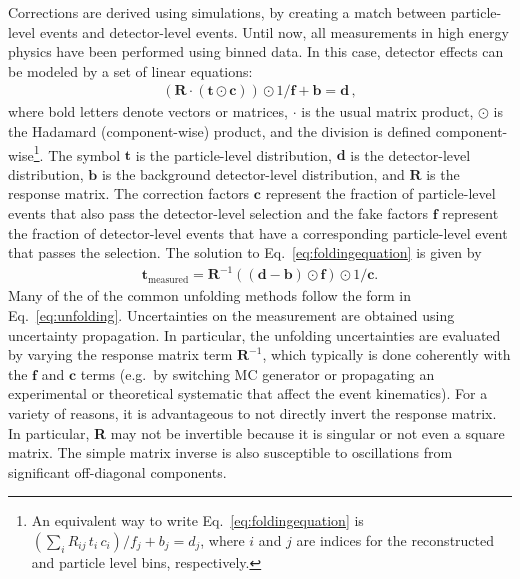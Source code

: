 Corrections are derived using simulations, by creating a match between particle-level events and detector-level events.  Until now, all measurements in high energy physics have been performed using binned data.   In this case, detector effects can be modeled by a set of linear equations:
\begin{align}
\label{eq:foldingequation}
\left(\textbf{R}\cdot (\textbf{t}\odot \textbf{c})\right)\odot 1/\textbf{f}+\textbf{b}=\textbf{d}\,,
\end{align}
where bold letters denote vectors or matrices, $\cdot$ is the usual matrix product, $\odot$ is the Hadamard (component-wise) product, and the division is defined component-wise\footnote{An equivalent way to write Eq.~\ref{eq:foldingequation} is $\left(\sum_{i}R_{ij}\,t_i\,c_i\right)/f_j+b_j=d_j$, where $i$ and $j$ are indices for the reconstructed and particle level bins, respectively.}. The symbol $\textbf{t}$ is the particle-level distribution, $\textbf{d}$ is the detector-level distribution, $\textbf{b}$ is the background detector-level distribution, and $\textbf{R}$ is the response matrix.  The correction factors $\textbf{c}$ represent the fraction of particle-level events that also pass the detector-level selection and the fake factors $\textbf{f}$ represent the fraction of detector-level events that have a corresponding particle-level event that passes the selection.  The solution to Eq.~\ref{eq:foldingequation} is given by
\begin{align}
\label{eq:unfolding}
\textbf{t}_\text{measured} = \textbf{R}^{-1}\left( (\textbf{d}-\textbf{b})\odot \textbf{f}\right)\odot 1/\textbf{c}.
\end{align}
Many of the of the common unfolding methods follow the form in Eq.~\ref{eq:unfolding}.
Uncertainties on the measurement are obtained using uncertainty propagation. In particular, the unfolding uncertainties are evaluated by varying the response matrix term $\mathbf{R}^{-1}$, which typically is done coherently with the $\mathbf{f}$ and $\mathbf{c}$ terms (e.g.\ by switching MC generator or propagating an experimental or theoretical systematic that affect the event kinematics).
For a variety of reasons, it is advantageous to not directly invert the response matrix.  In particular, \textbf{R} may not be invertible because it is singular or not even a square matrix.  The simple matrix inverse is also susceptible to oscillations from significant off-diagonal components.

